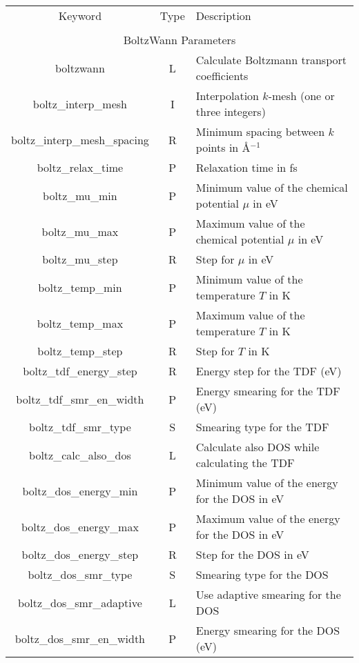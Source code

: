\begin{table}[hH!]
\begin{center}
\begin{tabular}{|c|c|p{6cm}|}
\hline
Keyword & Type & Description \\
        &      &             \\
\hline\hline
\multicolumn{3}{|c|}{BoltzWann Parameters} \\
\hline
{\sc boltzwann}   & L & Calculate Boltzmann transport coefficients \\
{\sc boltz\_interp\_mesh} & I & Interpolation $k$-mesh (one or three integers)\\ 
{\sc boltz\_interp\_mesh\_spacing} & R & Minimum spacing between $k$ points in \AA$^{-1}$\\
{\sc boltz\_relax\_time} & P & Relaxation time in fs\\
{\sc boltz\_mu\_min} & P & Minimum value of the chemical potential $\mu$ in eV\\
{\sc boltz\_mu\_max} & P & Maximum value of the chemical potential $\mu$ in eV\\
{\sc boltz\_mu\_step} & R & Step for $\mu$ in eV\\
{\sc boltz\_temp\_min} & P & Minimum value of the temperature $T$ in K \\
{\sc boltz\_temp\_max} & P & Maximum value of the temperature $T$ in K \\
{\sc boltz\_temp\_step} & R & Step for $T$ in K \\
{\sc boltz\_tdf\_energy\_step} & R & Energy step for the TDF (eV) \\
{\sc boltz\_tdf\_smr\_en\_width} & P & Energy smearing for the TDF (eV) \\
{\sc boltz\_tdf\_smr\_type} & S & Smearing type for the TDF \\
{\sc boltz\_calc\_also\_dos} & L & Calculate also DOS while calculating the TDF\\
{\sc boltz\_dos\_energy\_min} & P & Minimum value of the energy for the DOS in eV \\
{\sc boltz\_dos\_energy\_max} & P & Maximum value of the energy for the DOS in eV \\
{\sc boltz\_dos\_energy\_step} & R & Step for the DOS in eV\\
{\sc boltz\_dos\_smr\_type} & S & Smearing type for the DOS \\
{\sc boltz\_dos\_smr\_adaptive} & L & Use adaptive smearing for the DOS \\
{\sc boltz\_dos\_smr\_en\_width} & P  & Energy smearing for the DOS (eV) \\

\end{tabular}
\end{center}
\end{table}

